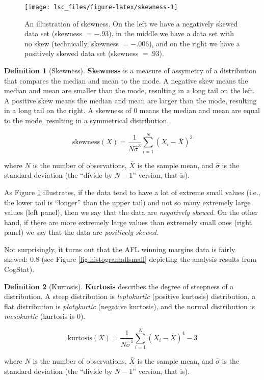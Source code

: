 \documentclass[
  11pt,
]{book}
\theoremstyle{definition}
\newtheorem{definition}{Definition}[chapter]
\theoremstyle{definition}
\theoremstyle{definition}
\theoremstyle{definition}
\theoremstyle{remark}
\begin{document}
\begin{figure}

{\centering \texttt{[image: lsc\_files/figure-latex/skewness-1]} 

}

\caption[An illustration of skewness.]{An illustration of skewness. On the left we have a negatively skewed data set (skewness $= -.93$), in the middle we have a data set with no skew (technically, skewness $= -.006$), and on the right we have a positively skewed data set (skewness $= .93$).}\label{fig:skewness}
\end{figure}

\begin{definition}[Skewness]
\protect\hypertarget{def:defskewness}{}\label{def:defskewness}\textbf{Skewness} is a measure of assymetry of a distribution that compares the median and mean to the mode. A negative skew means the median and mean are smaller than the mode, resulting in a long tail on the left. A positive skew means the median and mean are larger than the mode, resulting in a long tail on the right. A skewness of 0 means the median and mean are equal to the mode, resulting in a symmetrical distribution.

\[
\mbox{skewness}(X) = \frac{1}{N \hat{\sigma}^3} \sum_{i=1}^N (X_i - \bar{X})^3
\]

where \(N\) is the number of observations, \(\bar{X}\) is the sample mean, and \(\hat{\sigma}\) is the standard deviation (the ``divide by \(N-1\)'' version, that is).
\end{definition}

As Figure \ref{fig:skewness} illustrates, if the data tend to have a lot of extreme small values (i.e., the lower tail is ``longer'' than the upper tail) and not so many extremely large values (left panel), then we say that the data are \emph{negatively skewed}. On the other hand, if there are more extremely large values than extremely small ones (right panel) we say that the data are \emph{positively skewed}.

Not surprisingly, it turns out that the AFL winning margins data is fairly skewed: \(0.8\) (see Figure \ref{fig:histogramaflsmall} depicting the analysis results from CogStat).

\begin{definition}[Kurtosis]
\protect\hypertarget{def:defkurtosis}{}\label{def:defkurtosis}\textbf{Kurtosis} describes the degree of steepness of a distribution. A steep distribution is \emph{leptokurtic} (positive kurtosis) distribution, a flat distribution is \emph{platykurtic} (negative kurtosis), and the normal distribution is \emph{mesokurtic} (kurtosis is 0).

\[
\mbox{kurtosis}(X) = \frac{1}{N \hat\sigma^4} \sum_{i=1}^N \left( X_i - \bar{X} \right)^4 - 3
\]

where \(N\) is the number of observations, \(\bar{X}\) is the sample mean, and \(\hat{\sigma}\) is the standard deviation (the ``divide by \(N-1\)'' version, that is).
\end{definition}
\end{document}
